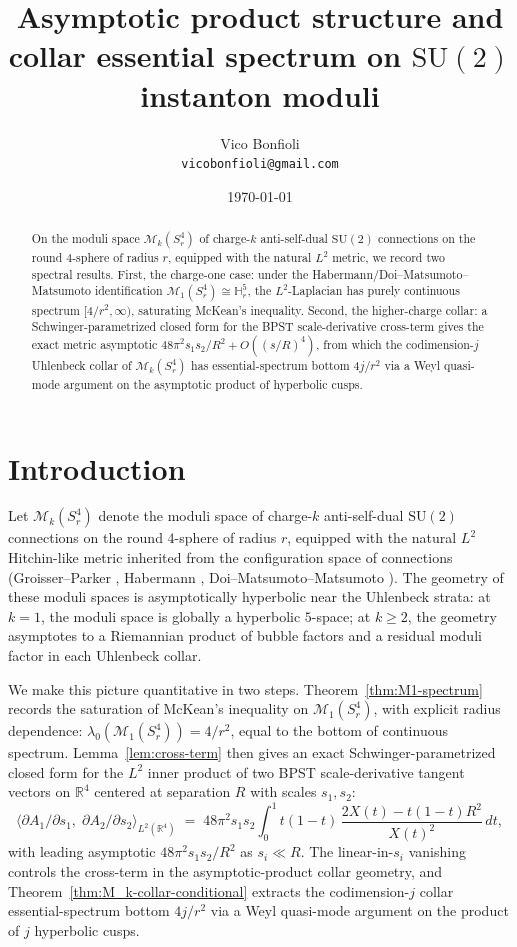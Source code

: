 \documentclass[11pt,letterpaper]{article}
\title{Asymptotic product structure and collar essential spectrum on $\mathrm{SU}(2)$ instanton moduli}
\author{Vico Bonfioli\\\small\texttt{vicobonfioli@gmail.com}}
\date{\today}
\theoremstyle{definition}
\newcommand{\bbR}{\mathbb{R}}
\newcommand{\bbH}{\mathbb{H}}
\newcommand{\cM}{\mathcal{M}}
\begin{document}
\maketitle

\begin{abstract}
On the moduli space $\cM_k(S^4_r)$ of charge-$k$ anti-self-dual $\mathrm{SU}(2)$ connections on the round $4$-sphere of radius $r$, equipped with the natural $L^2$ metric, we record two spectral results. First, the charge-one case: under the Habermann/Doi--Matsumoto--Matsumoto identification $\cM_1(S^4_r) \cong \bbH^5_r$, the $L^2$-Laplacian has purely continuous spectrum $[4/r^2, \infty)$, saturating McKean's inequality. Second, the higher-charge collar: a Schwinger-parametrized closed form for the BPST scale-derivative cross-term gives the exact metric asymptotic $48\pi^2 s_1 s_2/R^2 + O((s/R)^4)$, from which the codimension-$j$ Uhlenbeck collar of $\cM_k(S^4_r)$ has essential-spectrum bottom $4j/r^2$ via a Weyl quasi-mode argument on the asymptotic product of hyperbolic cusps.
\end{abstract}

\section{Introduction}

Let $\cM_k(S^4_r)$ denote the moduli space of charge-$k$ anti-self-dual $\mathrm{SU}(2)$ connections on the round $4$-sphere of radius $r$, equipped with the natural $L^2$ Hitchin-like metric inherited from the configuration space of connections (Groisser--Parker \cite{GP1987,GP1989}, Habermann \cite{Habermann1993}, Doi--Matsumoto--Matsumoto \cite{DMM1987}). The geometry of these moduli spaces is asymptotically hyperbolic near the Uhlenbeck strata: at $k=1$, the moduli space is globally a hyperbolic $5$-space; at $k \ge 2$, the geometry asymptotes to a Riemannian product of bubble factors and a residual moduli factor in each Uhlenbeck collar.

We make this picture quantitative in two steps. Theorem~\ref{thm:M1-spectrum} records the saturation of McKean's inequality on $\cM_1(S^4_r)$, with explicit radius dependence: $\lambda_0(\cM_1(S^4_r)) = 4/r^2$, equal to the bottom of continuous spectrum. Lemma~\ref{lem:cross-term} then gives an exact Schwinger-parametrized closed form for the $L^2$ inner product of two BPST scale-derivative tangent vectors on $\bbR^4$ centered at separation $R$ with scales $s_1, s_2$:
\[
\langle \partial A_1/\partial s_1,\;\partial A_2/\partial s_2 \rangle_{L^2(\bbR^4)} \;=\; 48\pi^2 s_1 s_2 \int_0^1 t(1-t)\,\frac{2X(t) - t(1-t)R^2}{X(t)^2}\,dt,
\]
with leading asymptotic $48\pi^2 s_1 s_2/R^2$ as $s_i \ll R$. The linear-in-$s_i$ vanishing controls the cross-term in the asymptotic-product collar geometry, and Theorem~\ref{thm:M_k-collar-conditional} extracts the codimension-$j$ collar essential-spectrum bottom $4j/r^2$ via a Weyl quasi-mode argument on the product of $j$ hyperbolic cusps.
\end{document}
